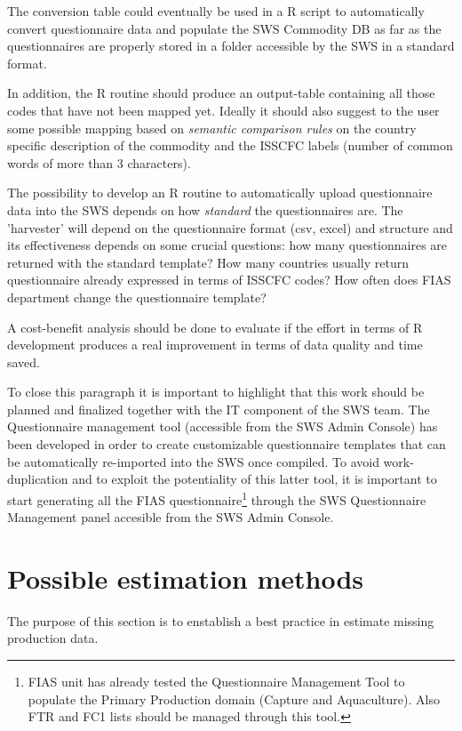 \documentclass[nojss]{jss}
\begin{document}
The conversion table could eventually be used in a R script to automatically convert questionnaire data and populate the SWS Commodity DB as far as the questionnaires are properly stored in a folder accessible by the SWS in a standard format.

In addition, the R routine should produce an output-table containing all those codes that have not been mapped yet. Ideally it should also suggest to the user some possible mapping based on \textit{semantic comparison rules} on the country specific description of the commodity and the ISSCFC labels (number of common words of more than 3 characters).

The possibility to develop an R routine to automatically upload questionnaire data into the SWS depends on how \textit{standard} the questionnaires are. 
The 'harvester' will depend on the questionnaire format (csv, excel) and structure and its effectiveness depends on some crucial questions: how many questionnaires are returned with the standard template? How many countries usually return questionnaire already expressed in terms of ISSCFC codes?
How often does FIAS department change the questionnaire template?

A cost-benefit analysis should be done to evaluate if the effort in terms of R development produces a real improvement in terms of data quality and time saved.


To close this paragraph it is important to highlight that this work should be planned and finalized together with the IT component of the SWS team. The Questionnaire management tool (accessible from the SWS Admin Console) has been developed in order to create customizable questionnaire templates that can be automatically re-imported into the SWS once compiled. To avoid work-duplication and to exploit the potentiality of this latter tool, it is important to start generating all the FIAS questionnaire\footnote{FIAS unit has already tested the Questionnaire Management Tool to populate the Primary Production domain (Capture and Aquaculture). Also FTR and FC1 lists should be managed through this tool.} through the SWS Questionnaire Management panel accesible from the SWS Admin Console.


\section{Possible estimation methods}
The purpose of this section is to enstablish a best practice in estimate missing production data.
\end{document}
